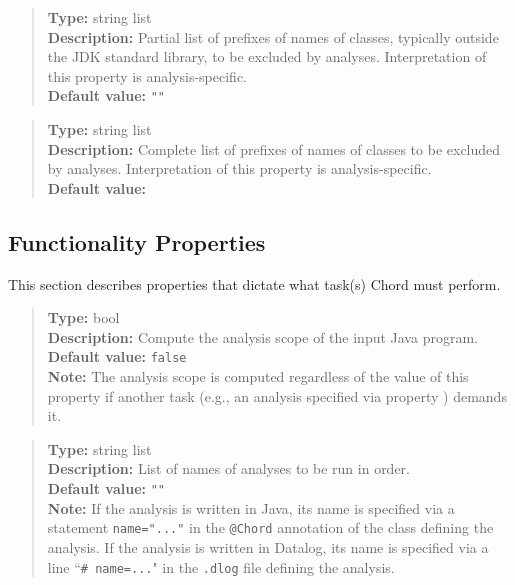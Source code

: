 \begin{quote}
{\bf Type:} string list \\
{\bf Description:} Partial list of prefixes of names of classes, typically outside the JDK standard library, to be excluded by analyses.  Interpretation of this property is analysis-specific. \\
{\bf Default value:} {\tt ""}
\end{quote}

\begin{quote}
{\bf Type:} string list \\
{\bf Description:} Complete list of prefixes of names of classes to be excluded by analyses.  Interpretation of this property is analysis-specific. \\
{\bf Default value:} 
\end{quote}

\subsection{Functionality Properties}
\label{sec:func-props}

This section describes properties that dictate what task(s) Chord must perform.

\begin{quote}
{\bf Type:} bool \\
{\bf Description:} Compute the analysis scope of the input Java program. \\
{\bf Default value:} {\tt false} \\
{\bf Note:} The analysis scope is computed regardless of the value of this property if another task (e.g., an analysis specified via property ) demands it.
\end{quote}

\begin{quote}
{\bf Type:} string list  \\
{\bf Description:} List of names of analyses to be run in order. \\
{\bf Default value:} {\tt ""} \\
{\bf Note:} If the analysis is written in Java, its name is specified via
a statement {\tt name="..."} in the {\tt @Chord} annotation of the class defining
the analysis.  If the analysis is written in Datalog, its name is specified via
a line ``{\tt \# name=...}" in the {\tt .dlog} file defining the analysis.
\end{quote}

